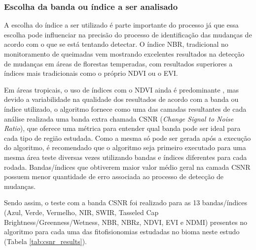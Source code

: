 \subsubsection{Escolha da banda ou índice a ser analisado}

A escolha do índice a ser utilizado é parte importante do processo já que essa escolha pode influenciar na precisão do processo de identificação das mudanças de acordo com o que se está tentando detectar. O índice NBR, tradicional no monitoramento de queimadas vem mostrando excelentes resultados na detecção de mudanças em áreas de florestas temperadas, com resultados superiores a índices mais tradicionais como o próprio NDVI ou o EVI.

Em áreas tropicais, o uso de índices com o NDVI ainda é predominante \citep{zebende2019, FRAGAL2016}, mas devido a variabilidade na qualidade dos resultados de acordo com a banda ou índice utilizado, o algoritmo fornece como uma das camadas resultantes de cada análise realizada uma banda extra chamada CSNR (\textit{Change Signal to Noise Ratio}), que oferece uma métrica para entender qual banda pode ser ideal para cada tipo de região estudada. Como a mesma só pode ser gerada após a execução do algoritmo, é recomendado que o algoritmo seja primeiro executado para uma mesma área teste diversas vezes utilizando bandas e índices diferentes para cada rodada. Bandas/índices que obtiverem maior valor médio geral na camada CSNR possuem menor quantidade de erro associada ao processo de detecção de mudanças.

Sendo assim, o teste com a banda CSNR foi realizado para as 13 bandas/índices (Azul, Verde, Vermelho, NIR, SWIR, Tasseled Cap Brightness/Greenness/Wetness, NBR, NBRz, NDVI, EVI e NDMI) presentes no algoritmo para cada uma das fitofisionomias estudadas no bioma neste estudo (Tabela \ref{tab:csnr_results}). 



